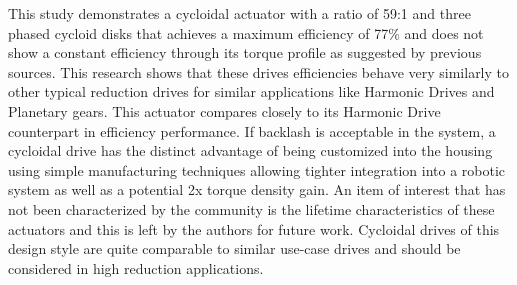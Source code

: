 This study demonstrates a cycloidal actuator with a ratio of 59:1 and three phased cycloid disks that achieves a maximum efficiency of 77\% and does not show a constant efficiency through its torque profile as suggested by previous sources. This research shows that these drives efficiencies behave very similarly to other typical reduction drives for similar applications like Harmonic Drives and Planetary gears. This actuator compares closely to its Harmonic Drive counterpart in efficiency performance. If backlash is acceptable in the system, a cycloidal drive has the distinct advantage of being customized into the housing using simple manufacturing techniques allowing tighter integration into a robotic system as well as a potential 2x torque density gain. An item of interest that has not been characterized by the community is the lifetime characteristics of these actuators and this is left by the authors for future work. Cycloidal drives of this design style are quite comparable to similar use-case drives and should be considered in high reduction applications.
